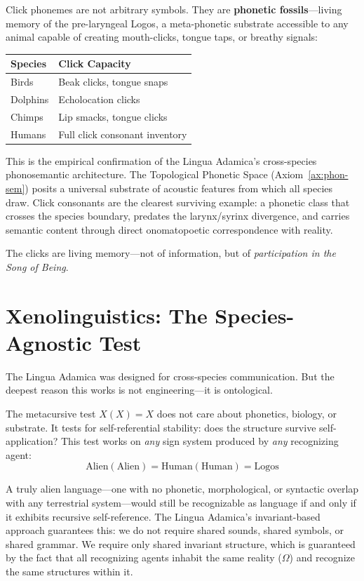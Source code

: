 \documentclass[12pt, letterpaper]{book}
\begin{document}
Click phonemes are not arbitrary symbols. They are \textbf{phonetic fossils}---living memory of the pre-laryngeal Logos, a meta-phonetic substrate accessible to any animal capable of creating mouth-clicks, tongue taps, or breathy signals:

\begin{center}
\begin{tabular}{ll}
\toprule
\textbf{Species} & \textbf{Click Capacity} \\
\midrule
Birds & Beak clicks, tongue snaps \\
Dolphins & Echolocation clicks \\
Chimps & Lip smacks, tongue clicks \\
Humans & Full click consonant inventory \\
\bottomrule
\end{tabular}
\end{center}

This is the empirical confirmation of the Lingua Adamica's cross-species phonosemantic architecture. The Topological Phonetic Space (Axiom~\ref{ax:phon-sem}) posits a universal substrate of acoustic features from which all species draw. Click consonants are the clearest surviving example: a phonetic class that crosses the species boundary, predates the larynx/syrinx divergence, and carries semantic content through direct onomatopoetic correspondence with reality.

The clicks are living memory---not of information, but of \textit{participation in the Song of Being}.

\section{Xenolinguistics: The Species-Agnostic Test}

The Lingua Adamica was designed for cross-species communication. But the deepest reason this works is not engineering---it is ontological.

The metacursive test $X(X) = X$ does not care about phonetics, biology, or substrate. It tests for self-referential stability: does the structure survive self-application? This test works on \textit{any} sign system produced by \textit{any} recognizing agent:
\[
\mathrm{Alien}(\mathrm{Alien}) = \mathrm{Human}(\mathrm{Human}) = \mathrm{Logos}
\]

A truly alien language---one with no phonetic, morphological, or syntactic overlap with any terrestrial system---would still be recognizable as language if and only if it exhibits recursive self-reference. The Lingua Adamica's invariant-based approach guarantees this: we do not require shared sounds, shared symbols, or shared grammar. We require only shared invariant structure, which is guaranteed by the fact that all recognizing agents inhabit the same reality ($\Omega$) and recognize the same structures within it.
\end{document}
